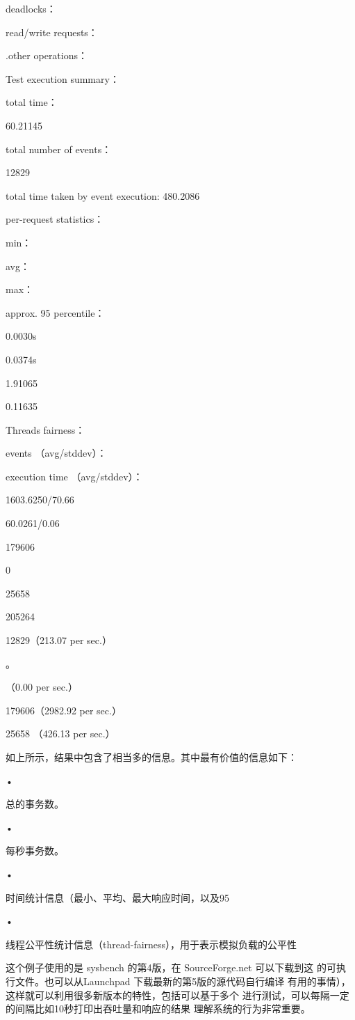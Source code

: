 deadlocks：

read/write requests：

.other operations：

Test execution summary：

total time：

60.21145

total number of events：

12829

total time taken by event execution: 480.2086

per-request statistics：

min：

avg：

max：

approx. 95 percentile：

0.0030s

0.0374s

1.91065

0.11635

Threads fairness：

events （avg/stddev）：

execution time （avg/stddev）：

1603.6250/70.66

60.0261/0.06

179606

0

25658

205264

12829（213.07 per sec.）

。

（0.00 per sec.）

179606（2982.92 per sec.）

25658 （426.13 per sec.）

如上所示，结果中包含了相当多的信息。其中最有价值的信息如下：

•

总的事务数。

•

每秒事务数。

•

时间统计信息（最小、平均、最大响应时间，以及95%

•

线程公平性统计信息（thread-fairness），用于表示模拟负载的公平性

这个例子使用的是 sysbench 的第4版，在 SourceForge.net 可以下载到这
的可执行文件。也可以从Launchpad 下载最新的第5版的源代码自行编译
有用的事情），这样就可以利用很多新版本的特性，包括可以基于多个
进行测试，可以每隔一定的间隔比如10秒打印出吞吐量和响应的结果
理解系统的行为非常重要。

